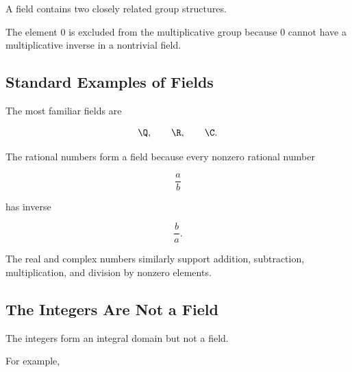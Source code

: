 A field contains two closely related group structures.

\begin{center}
\end{center}

The element \(0\) is excluded from the multiplicative group because \(0\)
cannot have a multiplicative inverse in a nontrivial field.

\subsection{Standard Examples of Fields}
\label{subsec:standard-fields}

The most familiar fields are

\[ \Q,\qquad\R,\qquad\C. \]

The rational numbers form a field because every nonzero rational number

\[ \frac{a}{b} \]

has inverse

\[ \frac{b}{a}. \]

The real and complex numbers similarly support addition, subtraction,
multiplication, and division by nonzero elements.

\subsection{The Integers Are Not a Field}
\label{subsec:integers-not-field}

The integers form an integral domain but not a field.

For example,

